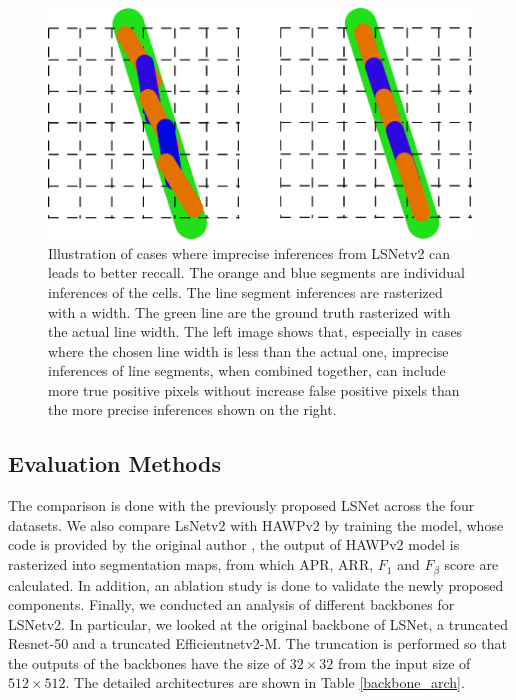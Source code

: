 \documentclass[journal]{IEEEtran}
\begin{document}
\begin{figure}
  \includegraphics[width=\linewidth]{imgs/others/why_f_beta.png}
  \caption{Illustration of cases where imprecise inferences from LSNetv2 can leads to better reccall. The orange and blue segments are individual inferences of the cells. The line segment inferences are rasterized with a width. The green line are the ground truth rasterized with the actual line width. The left image shows that, especially in cases where the chosen line width is less than the actual one, imprecise inferences of line segments, when combined together, can include more true positive pixels without increase false positive pixels than the more precise inferences shown on the right.}
  \label{hirecall}
\end{figure}

\subsection{Evaluation Methods}

The comparison is done with the previously proposed LSNet across the four datasets. We also compare LsNetv2 with HAWPv2 by training the model, whose code is provided by the original author \cite{hawpv2code}, the output of HAWPv2 model is rasterized into segmentation maps, from which APR, ARR, $F_1$ and $F_\beta$ score are calculated. In addition, an ablation study is done to validate the newly proposed components. Finally, we conducted an analysis of different backbones for LSNetv2. In particular, we looked at the original backbone of LSNet, a truncated Resnet-50 \cite{resnet} and a truncated Efficientnetv2-M\cite{efficientnetv2}. The truncation is performed so that the outputs of the backbones have the size of $32 \times 32$ from the input size of $512 \times 512$. The detailed architectures are shown in Table \ref{backbone_arch}.
\end{document}
